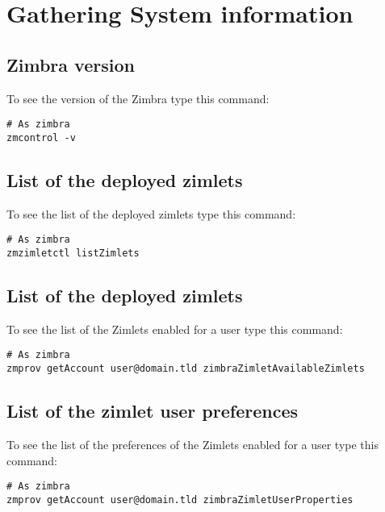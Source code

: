 \section{Gathering System information}
\label{sect:gatheringinfo}

    \subsection{Zimbra version}
    \label{sect:gatheringinfo-zversion}
        To see the version of the Zimbra type this command:
        \begin{verbatim}
# As zimbra
zmcontrol -v
        \end{verbatim}

    \subsection{List of the deployed zimlets}
    \label{sect:gatheringinfo-listzimlets}
        To see the list of the deployed zimlets type this command:
        \begin{verbatim}
# As zimbra
zmzimletctl listZimlets
        \end{verbatim}

    \subsection{List of the deployed zimlets}
    \label{sect:gatheringinfo-userzimlets}
        To see the list of the Zimlets enabled for a user type this command:
        \begin{verbatim}
# As zimbra
zmprov getAccount user@domain.tld zimbraZimletAvailableZimlets
        \end{verbatim}

    \subsection{List of the zimlet user preferences}
    \label{sect:gatheringinfo-userzimlets-pref}
        To see the list of the preferences of the Zimlets enabled for a user type this command:
        \begin{verbatim}
# As zimbra
zmprov getAccount user@domain.tld zimbraZimletUserProperties
        \end{verbatim}
